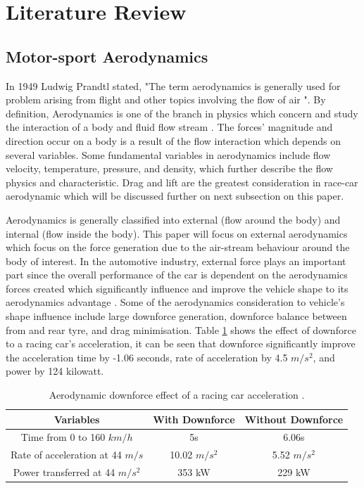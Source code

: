 \section{Literature Review}

\subsection{Motor-sport Aerodynamics}
In 1949 Ludwig Prandtl stated, "The term aerodynamics is generally used for problem arising from flight and other topics involving the flow of air \cite{Anderson2010FundamentalsAerodynamics}". By definition, Aerodynamics is one of the branch in physics which concern and study the interaction of a body and fluid flow stream \cite{Scibor-Rylski1984RoadAerodynamics}. The forces' magnitude and direction occur on a body is a result of the flow interaction which depends on several variables. Some fundamental variables in aerodynamics include flow velocity, temperature, pressure, and density, which further describe the flow physics and characteristic. Drag and lift are the greatest consideration in race-car aerodynamic which will be discussed further on next subsection on this paper.

\noindent Aerodynamics is generally classified into external (flow around  the body) and internal (flow inside the body). This paper will focus on external aerodynamics which focus on the force generation due to the air-stream behaviour around the body of interest. In the automotive industry, external force plays an important part since the overall performance of the car is dependent on the aerodynamics forces created which significantly influence and improve the vehicle shape to its aerodynamics advantage \cite{Scibor-Rylski1984RoadAerodynamics}. Some of the aerodynamics consideration to vehicle's shape influence include large downforce generation, downforce balance between from and rear tyre, and drag minimisation. Table \ref{Table1} shows the effect of downforce to a racing car's acceleration, it can be seen that downforce significantly improve the acceleration time by -1.06 seconds, rate of acceleration by 4.5 $m/s^2$, and power by 124 kilowatt. 

\begin{table}[!ht]
\caption{\label{Table1} Aerodynamic downforce effect of a racing car acceleration \cite{Scibor-Rylski1984RoadAerodynamics}.}
\vspace{-5mm}
\begin{center}
 \begin{tabular}{||c| c| c ||} 
 \hline
 Variables & With Downforce & Without Downforce \\ [0.5ex] 
 \hline\hline
 Time from 0 to 160 $km/h$ & 5s & 6.06s \\ 
 \hline
 Rate of acceleration at 44 $m/s$ & 10.02 $m/s^{2}$ & 5.52 $m/s^2$ \\
 \hline
 Power transferred at 44 $m/s^2$ & 353 kW & 229 kW  \\
 \hline
\end{tabular}
\end{center}
\end{table}

